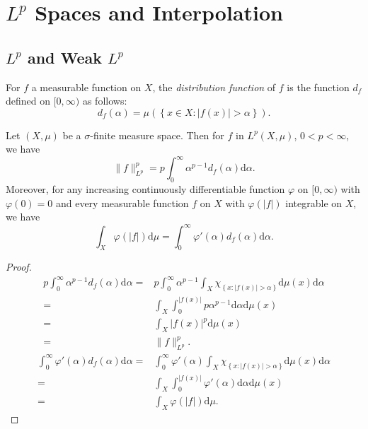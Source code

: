 \section{$L^{p}$ Spaces and Interpolation}
\subsection{$L^{p}$ and Weak  $L^{p}$}
\begin{definition}
  For $f$ a measurable function  on $X$, the \textit{distribution function} of $f$ is the function $d_f$ defined on $[0,\infty)$ as follows:
  \[
    d_f(\alpha)=\mu\left( \left\{ x\in X:|f(x)|>\alpha \right\}  \right). 
  \] 
\end{definition}
\begin{proposition}
  Let $(X,\mu)$ be a $\sigma$-finite measure space. Then for $f$ in $L^{p}(X,\mu)$, $0<p<\infty$, we have
\begin{equation}
  \|f\|_{L^{p}}^{p}=p \int_0^{\infty}\alpha ^{p-1}d_{f}(\alpha)\mathrm{d}\alpha.
\end{equation} 
Moreover, for any increasing continuously differentiable function $\varphi$ on $[0,\infty)$ with
$\varphi(0)=0$ and every measurable function $f$ on $X$ with $\varphi(|f|)$ integrable on $X$, we have
\begin{equation}
  \int_{X}\varphi(|f|)\mathrm{d}\mu=\int_{0}^{\infty}\varphi'(\alpha)d_f(\alpha)\mathrm{d}\alpha.
\end{equation}
\end{proposition}
\begin{proof}
  \begin{equation*}
    \begin{aligned}
      p \int_0^{\infty}\alpha ^{p-1}d_f(\alpha)\mathrm{d}\alpha=& p \int_0^{\infty}\alpha ^{p-1}\int_{X}\chi_{\left\{ x:|f(x)|>\alpha \right\} }\mathrm{d}\mu(x)\mathrm{d}\alpha\\
      =& \int_{X}\int_{0}^{|f(x)|}p\alpha ^{p-1}\mathrm{d}\alpha \mathrm{d}\mu(x)\\
      =& \int_{X}|f(x)|^{p}\mathrm{d}\mu(x)\\
      =& \|f\|_{L^{p}}^{p}.
    \end{aligned}
  \end{equation*}
  \begin{equation*}
    \begin{aligned}
      \int_{0}^{\infty}\varphi'(\alpha)d_f(\alpha)\mathrm{d}\alpha=& \int_{0}^{\infty}\varphi'(\alpha)\int_{X}\chi_{\left\{ x:|f(x)|>\alpha \right\} }\mathrm{d}\mu(x)\mathrm{d}\alpha\\
      =& \int_{X}\int_0^{|f(x)|}\varphi'(\alpha)\mathrm{d}\alpha \mathrm{d}\mu(x)\\
      =& \int_{X}\varphi(|f|)\mathrm{d}\mu. 
    \end{aligned}
  \end{equation*}
\end{proof}
